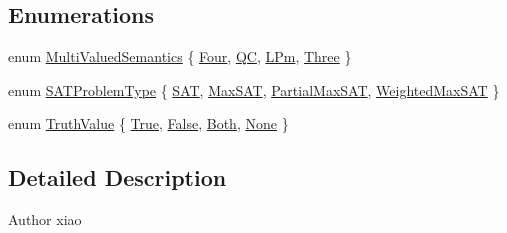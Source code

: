 \subsection*{Enumerations}
\begin{DoxyCompactItemize}
\item 
enum \hyperlink{namespaceedu_1_1pku_1_1id_ad71ddcb0be4b31cdeeb2a5d755309f2d}{MultiValuedSemantics} \{ \hyperlink{namespaceedu_1_1pku_1_1id_ad71ddcb0be4b31cdeeb2a5d755309f2d}{Four}, 
\hyperlink{namespaceedu_1_1pku_1_1id_ad71ddcb0be4b31cdeeb2a5d755309f2d}{QC}, 
\hyperlink{namespaceedu_1_1pku_1_1id_ad71ddcb0be4b31cdeeb2a5d755309f2d}{LPm}, 
\hyperlink{namespaceedu_1_1pku_1_1id_ad71ddcb0be4b31cdeeb2a5d755309f2d}{Three}
 \}
\item 
enum \hyperlink{namespaceedu_1_1pku_1_1id_a7936f4efdc70b70b965d63bd005a2513}{SATProblemType} \{ \hyperlink{namespaceedu_1_1pku_1_1id_a7936f4efdc70b70b965d63bd005a2513}{SAT}, 
\hyperlink{namespaceedu_1_1pku_1_1id_a7936f4efdc70b70b965d63bd005a2513}{MaxSAT}, 
\hyperlink{namespaceedu_1_1pku_1_1id_a7936f4efdc70b70b965d63bd005a2513}{PartialMaxSAT}, 
\hyperlink{namespaceedu_1_1pku_1_1id_a7936f4efdc70b70b965d63bd005a2513}{WeightedMaxSAT}
 \}
\item 
enum \hyperlink{namespaceedu_1_1pku_1_1id_a01cdd35063021f272bd905de5f43f634}{TruthValue} \{ \hyperlink{namespaceedu_1_1pku_1_1id_a01cdd35063021f272bd905de5f43f634}{True}, 
\hyperlink{namespaceedu_1_1pku_1_1id_a01cdd35063021f272bd905de5f43f634}{False}, 
\hyperlink{namespaceedu_1_1pku_1_1id_a01cdd35063021f272bd905de5f43f634}{Both}, 
\hyperlink{namespaceedu_1_1pku_1_1id_a01cdd35063021f272bd905de5f43f634}{None}
 \}
\end{DoxyCompactItemize}


\subsection{Detailed Description}
\begin{DoxyAuthor}{Author}
xiao 
\end{DoxyAuthor}


